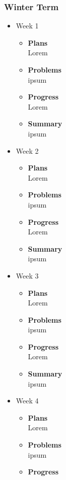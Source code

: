 	\subsubsection{Winter Term}
	\begin{itemize}
		\item{Week 1}
			\begin{itemize}
				\item \textbf{Plans} \\
				Lorem
				\item \textbf{Problems} \\
				ipsum
				\item \textbf{Progress} \\
				Lorem
				\item \textbf{Summary} \\
				ipsum
			\end{itemize}
		\item{Week 2}
			\begin{itemize}
				\item \textbf{Plans} \\
				Lorem
				\item \textbf{Problems} \\
				ipsum
				\item \textbf{Progress} \\
				Lorem
				\item \textbf{Summary} \\
				ipsum
			\end{itemize}
		\item{Week 3}
			\begin{itemize}
				\item \textbf{Plans} \\
				Lorem
				\item \textbf{Problems} \\
				ipsum
				\item \textbf{Progress} \\
				Lorem
				\item \textbf{Summary} \\
				ipsum
			\end{itemize}
		\item{Week 4}
			\begin{itemize}
				\item \textbf{Plans} \\
				Lorem
				\item \textbf{Problems} \\
				ipsum
				\item \textbf{Progress} \\

\end{itemize}
\end{itemize}
